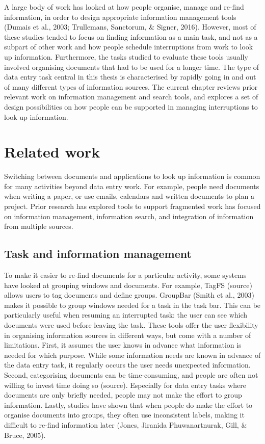 A large body of work has looked at how people organise, manage and re-find information, in order to design appropriate information management tools (Dumais et al., 2003; Trullemans, Sanctorum, & Signer, 2016). However, most of these studies tended to focus on finding information as a main task, and not as a subpart of other work and how people schedule interruptions from work to look up information. Furthermore, the tasks studied to evaluate these tools usually involved organising documents that had to be used for a longer time. The type of data entry task central in this thesis is characterised by rapidly going in and out of many different types of information sources. The current chapter reviews prior relevant work on information management and search tools, and explores a set of design possibilities on how people can be supported in managing interruptions to look up information.

\section{Related work}
Switching between documents and applications to look up information is common for many activities beyond data entry work. For example, people need documents when writing a paper, or use emails, calendars and written documents to plan a project. Prior research has explored tools to support fragmented work has focused on information management, information search, and integration of information from multiple sources. 

\subsection{Task and information management}
To make it easier to re-find documents for a particular activity, some systems have looked at grouping windows and documents. For example, TagFS (source) allows users to tag documents and define groups. GroupBar (Smith et al., 2003) makes it possible to group windows needed for a task in the task bar. This can be particularly useful when resuming an interrupted task: the user can see which documents were used before leaving the task.
These tools offer the user flexibility in organising information sources in different ways, but come with a number of limitations. First, it assumes the user knows in advance what information is needed for which purpose. While some information needs are known in advance of the data entry task, it regularly occurs the user needs unexpected information. Second, categorising documents can be time-consuming, and people are often not willing to invest time doing so (source). Especially for data entry tasks where documents are only briefly needed, people may not make the effort to group information. Lastly, studies have shown that when people do make the effort to organise documents into groups, they often use inconsistent labels, making it difficult to re-find information later (Jones, Jiranida Phuwanartnurak, Gill, & Bruce, 2005). 

